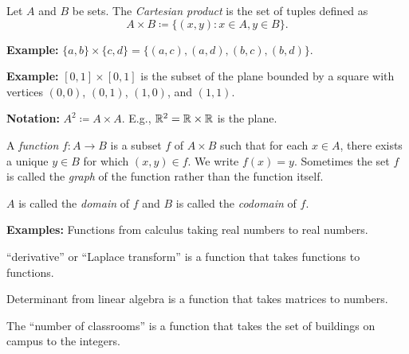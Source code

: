 \documentclass[10pt,aspectratio=149]{beamer}
\begin{document}
\begin{frame}


\begin{definition}
Let $A$ and $B$ be sets.  The \emph{Cartesian product}
is the set of tuples defined as
\begin{equation*}
A \times B \coloneqq
\bigl\{ (x,y) : x \in A, y \in B \bigr\} .
\end{equation*}
\end{definition}

\pause

\textbf{Example:} $\{ a,b \} \times \{ c , d\} = \bigl\{ (a,c), (a,d), (b,c), (b,d) \bigr\}$.

\medskip
\pause

\textbf{Example:} $[0,1] \times [0,1]$ is the subset of
the plane bounded by a square with vertices $(0,0)$, $(0,1)$, $(1,0)$, and $(1,1)$.

\medskip
\pause

\textbf{Notation:} $A^2 \coloneqq A \times A$.  E.g., ${\mathbb{R}}^2 = {\mathbb{R}} \times {\mathbb{R}}$ is the
plane.

\medskip
\pause



\begin{definition}
A \emph{function} $f \colon A \to B$ is a subset $f$ of $A \times B$
such that for each $x \in A$, there exists a unique $y \in B$ for which $(x,y) \in f$.
\pause
We write $f(x) = y$.
\pause
Sometimes
the set $f$ is called the \emph{graph} of the function rather than
the function itself.

\medskip
\pause
$A$ is called the \emph{domain} of $f$ and
$B$ is called the \emph{codomain} of $f$.
\end{definition}

\end{frame}

\begin{frame}

\textbf{Examples:} Functions from calculus taking real numbers
to real numbers.

\pause
\medskip
``derivative'' or ``Laplace transform'' is a function that takes
functions to functions.

\pause
\medskip
Determinant from linear algebra is a function that takes matrices to
numbers.

\pause
\medskip

The ``number of classrooms'' is a function that takes the set of buildings
on campus to the integers.
\end{frame}
\end{document}

